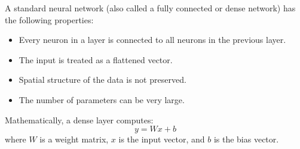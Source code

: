 \documentclass[a4paper]{article}
\title{}
\date{}
\begin{document}
    \maketitle

    
    
    A standard neural network (also called a fully connected or dense network) has the following properties:
    
    \begin{itemize}
        \item Every neuron in a layer is connected to all neurons in the previous layer.
        \item The input is treated as a flattened vector.
        \item Spatial structure of the data is not preserved.
        \item The number of parameters can be very large.
    \end{itemize}
    
    Mathematically, a dense layer computes:
    \[
        y = Wx + b
    \]
    where \( W \) is a weight matrix, \( x \) is the input vector, and \( b \) is the bias vector.
    
\end{document}

